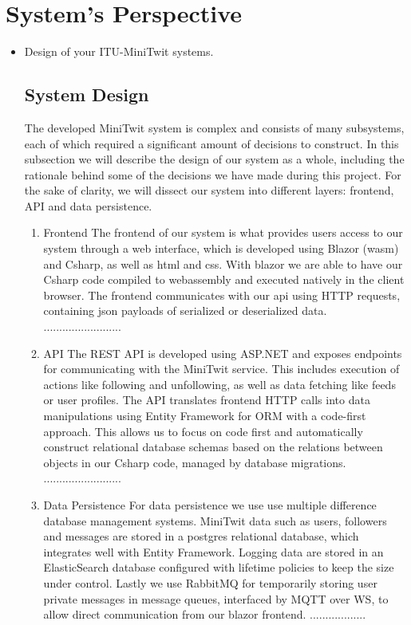 \section{System's Perspective}

\begin{itemize}
  \item Design of your ITU-MiniTwit systems.
  \subsection{System Design}
  The developed MiniTwit system is complex and consists of many subsystems, each of which required a significant amount of decisions to construct.
  In this subsection we will describe the design of our system as a whole, including the rationale behind some of the decisions we have made during this project.
  \newline
  For the sake of clarity, we will dissect our system into different layers: frontend, API and data persistence.
  \begin{enumerate}
    \item Frontend\newline
    The frontend of our system is what provides users access to our system through a web interface, which is developed using Blazor (wasm) and Csharp, as well as html and css.
    With blazor we are able to have our Csharp code compiled to webassembly and executed natively in the client browser.
    The frontend communicates with our api using HTTP requests, containing json payloads of serialized or deserialized data.
    .........................

    \item API\newline
    The REST API is developed using ASP.NET and exposes endpoints for communicating with the MiniTwit service. 
    This includes execution of actions like following and unfollowing, as well as data fetching like feeds or user profiles.
    The API translates frontend HTTP calls into data manipulations using Entity Framework for ORM with a code-first approach.
    This allows us to focus on code first and automatically construct relational database schemas based on the relations between objects in our Csharp code, managed by database migrations.
    .........................

    \item Data Persistence\newline
    For data persistence we use use multiple difference database management systems. 
    MiniTwit data such as users, followers and messages are stored in a postgres relational database, which integrates well with Entity Framework.
    Logging data are stored in an ElasticSearch database configured with lifetime policies to keep the size under control.
    Lastly we use RabbitMQ for temporarily storing user private messages in message queues, interfaced by MQTT over WS, to allow direct communication from our blazor frontend.
    ..................


\end{enumerate}
\end{itemize}
